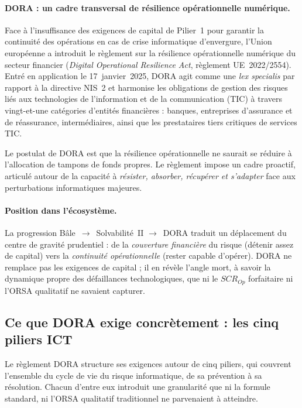 \documentclass[11pt,a4paper]{article}
\theoremstyle{navystyle}
\theoremstyle{navydef}
\begin{document}
\paragraph{DORA : un cadre transversal de résilience opérationnelle numérique.}
Face à l'insuffisance des exigences de capital de Pilier~1 pour garantir la continuité
des opérations en cas de crise informatique d'envergure, l'Union européenne a introduit
le règlement sur la résilience opérationnelle numérique du secteur financier
(\emph{Digital Operational Resilience Act}, règlement UE~2022/2554). Entré en application
le 17~janvier~2025, DORA agit comme une \emph{lex specialis} par rapport à la directive
NIS~2 et harmonise les obligations de gestion des risques liés aux technologies de
l'information et de la communication (TIC) à travers vingt-et-une catégories
d'entités financières : banques, entreprises d'assurance et de réassurance,
intermédiaires, ainsi que les prestataires tiers critiques de services TIC.

Le postulat de DORA est que la résilience opérationnelle ne saurait se réduire à
l'allocation de tampons de fonds propres. Le règlement impose un cadre proactif, articulé
autour de la capacité à \emph{résister, absorber, récupérer et s'adapter} face aux
perturbations informatiques majeures.

\paragraph{Position dans l'écosystème.} La progression Bâle~$\rightarrow$~Solvabilité~II
$\rightarrow$~DORA traduit un déplacement du centre de gravité prudentiel : de la
\emph{couverture financière} du risque (détenir assez de capital) vers la \emph{continuité
opérationnelle} (rester capable d'opérer). DORA ne remplace pas les exigences de capital ;
il en révèle l'angle mort, à savoir la dynamique propre des défaillances technologiques,
que ni le $SCR_{Op}$ forfaitaire ni l'ORSA qualitatif ne savaient capturer.

\subsection{Ce que DORA exige concrètement : les cinq piliers ICT}

Le règlement DORA structure ses exigences autour de cinq piliers, qui couvrent
l'ensemble du cycle de vie du risque informatique, de sa prévention à sa
résolution. Chacun d'entre eux introduit une granularité que ni la formule
standard, ni l'ORSA qualitatif traditionnel ne parvenaient à atteindre.
\end{document}
